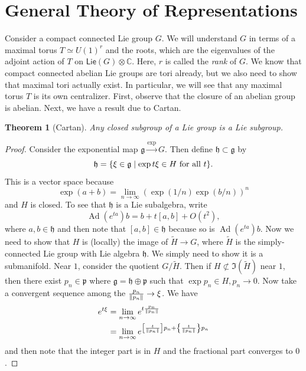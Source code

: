 \documentclass[leqno, openany]{memoir}
\newtheorem{thm}{Theorem}[section]
\theoremstyle{definition}
\theoremstyle{remark}
\theoremstyle{plain}
\theoremstyle{definition}
\theoremstyle{remark}
\newcommand{\C}{\mathbb{C}}
\newcommand{\mf}[1]{\mathfrak{#1}}
\newcommand{\ms}[1]{\mathsf{#1}}
\newcommand{\wtl}[1]{\widetilde{#1}}
\DeclareMathOperator{\Ad}{Ad}
\begin{document}
\section{General Theory of Representations}%
\label{sec:general_theory_of_representations}

Consider a compact connected Lie group $G$. We will understand $G$ in terms of a maximal torus $T \simeq {U(1)}^r$ and the roots, which are the eigenvalues of the adjoint action of $T$ on $\ms{Lie}(G) \otimes \C$. Here, $r$ is called the \textit{rank} of $G$. We know that compact connected abelian Lie groups are tori already, but we also need to show that maximal tori actually exist. In particular, we will see that any maximal torus $T$ is its own centralizer. First, observe that the closure of an abelian group is abelian. Next, we have a result due to Cartan.

\begin{thm}[Cartan]
    Any closed subgroup of a Lie group is a Lie subgroup.
\end{thm}

\begin{proof}
    Consider the exponential map $\mf{g} \xrightarrow{\exp} G$. Then define $\mf{h} \subset \mf{g}$ by
    \[ \mf{h} = \qty{ \xi \in \mf{g} \mid \exp t \xi \in H \text{~for all } t }. \]
    This is a vector space because
    \[ \exp(a+b) = \lim_{n \to \infty} {(\exp(1/n) \exp(b/n))}^n \]
    and $H$ is closed. To see that $\mf{h}$ is a Lie subalgebra, write 
    \[ \Ad(e^{t a}) b = b + t[a,b] + O(t^2), \]
    where $a,b \in \mf{h}$ and then note that $[a,b] \in \mf{h}$ because so is $\Ad(e^{ta})b$. Now we need to show that $H$ is (locally) the image of $\wtl{H} \to G$, where $\wtl{H}$ is the simply-connected Lie group with Lie algebra $\mf{h}$. We simply need to show it is a submanifold. Near $1$, consider the quotient $G / \wtl{H}$. Then if $H \not\subset \Im(\wtl{H})$ near $1$, then there exist $p_n \in \mf{p}$ where $\mf{g} = \mf{h} \oplus \mf{p}$ such that $\exp p_n \in H, p_n \to 0$. Now take a convergent sequence among the $\frac{p_n}{\norm{p_n}} \to \xi$. We have
    \begin{align*} 
        e^{t \xi} &= \lim_{n \to \infty} e^{t \frac{p_n}{\norm{p_n}}} \\
                  &= \lim_{n \to \infty} e^{\qty[\frac{t}{\norm{p_n}}] p_n + \qty{ \frac{t}{\norm{p_n}}} p_n }
    \end{align*}
    and then note that the integer part is in $H$ and the fractional part converges to $0$.
\end{proof}
\end{document}

